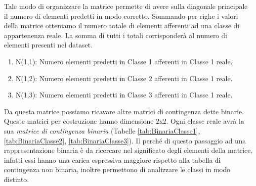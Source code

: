 Tale modo di organizzare la matrice permette di avere sulla diagonale principale il numero di elementi predetti in modo corretto.
Sommando per righe i valori della matrice otteniamo il numero totale di elementi afferenti ad una classe di appartenenza reale.
La somma di tutti i totali corrisponderà al numero di elementi presenti nel dataset.
\newline
 
\begin{enumerate}
	\item N(1,1): Numero elementi predetti in Classe 1 afferenti in Classe 1 reale.
	\item N(1,2): Numero elementi predetti in Classe 2 afferenti in Classe 1 reale.
	\item N(1,3): Numero elementi predetti in Classe 3 afferenti in Classe 1 reale.
\end{enumerate}

Da questa matrice possiamo ricavare altre matrici di contingenza dette binarie.
Queste matrici per costruzione hanno dimensione 2x2.
Ogni classe reale avrà la sua \textit{matrice di contingenza binaria} (Tabelle \ref{tab:BinariaClasse1}, \ref{tab:BinariaClasse2}, \ref{tab:BinariaClasse3}). Il perché di questo passaggio ad una rappresentazione binaria è da ricercare nel significato degli elementi della matrice, infatti essi hanno una carica espressiva maggiore rispetto alla tabella di contingenza non binaria, inoltre permettono di analizzare le classi in modo distinto.

